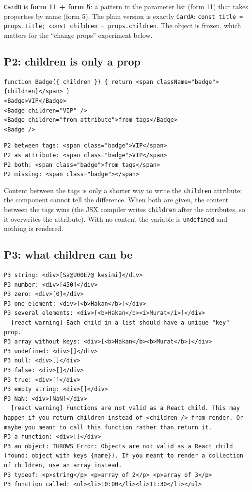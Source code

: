 \passthrough{\lstinline!CardB!} is \textbf{form 11 + form 5}: a pattern in the parameter list (form 11) that takes properties by name (form 5).
The plain version is exactly \passthrough{\lstinline!CardA!}: \passthrough{\lstinline!const title = props.title; const children = props.children!}.
The object is frozen, which matters for the ``change props'' experiment below.

\subsection{P2: children is only a prop}\label{p2-children-is-only-a-prop}

\begin{lstlisting}
function Badge({ children }) { return <span className="badge">{children}</span> }
<Badge>VIP</Badge>
<Badge children="VIP" />
<Badge children="from attribute">from tags</Badge>
<Badge />
\end{lstlisting}

\begin{lstlisting}
P2 between tags: <span class="badge">VIP</span>
P2 as attribute: <span class="badge">VIP</span>
P2 both: <span class="badge">from tags</span>
P2 missing: <span class="badge"></span>
\end{lstlisting}

Content between the tags is only a shorter way to write the \passthrough{\lstinline!children!} attribute; the component cannot tell the difference.
When both are given, the content between the tags wins (the JSX compiler writes \passthrough{\lstinline!children!} after the attributes, so it
overwrites the attribute). With no content the variable is \passthrough{\lstinline!undefined!} and nothing is rendered.

\subsection{P3: what children can be}\label{p3-what-children-can-be}

\begin{lstlisting}
P3 string: <div>[Sa@U00E7@ kesimi]</div>
P3 number: <div>[450]</div>
P3 zero: <div>[0]</div>
P3 one element: <div>[<b>Hakan</b>]</div>
P3 several elements: <div>[<b>Hakan</b><i>Murat</i>]</div>
  [react warning] Each child in a list should have a unique "key" prop.
P3 array without keys: <div>[<b>Hakan</b><b>Murat</b>]</div>
P3 undefined: <div>[]</div>
P3 null: <div>[]</div>
P3 false: <div>[]</div>
P3 true: <div>[]</div>
P3 empty string: <div>[]</div>
P3 NaN: <div>[NaN]</div>
  [react warning] Functions are not valid as a React child. This may happen if you return children instead of <children /> from render. Or maybe you meant to call this function rather than return it.
P3 a function: <div>[]</div>
P3 an object: THROWS Error: Objects are not valid as a React child (found: object with keys {name}). If you meant to render a collection of children, use an array instead.
P3 typeof: <p>string</p> <p>array of 2</p> <p>array of 3</p>
P3 function called: <ul><li>10:00</li><li>11:30</li></ul>
\end{lstlisting}


